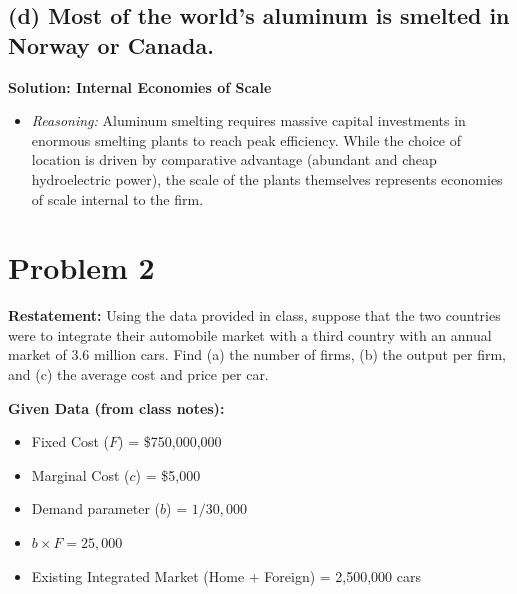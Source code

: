 \documentclass[11pt, letterpaper]{article}
\begin{document}
\subsection*{(d) Most of the world's aluminum is smelted in Norway or Canada.}
\noindent \textbf{Solution: Internal Economies of Scale}
\begin{itemize}
  \item \textit{Reasoning:} Aluminum smelting requires massive capital investments in enormous smelting plants to reach peak efficiency. While the choice of location is driven by comparative advantage (abundant and cheap hydroelectric power), the scale of the plants themselves represents economies of scale internal to the firm.
\end{itemize}

\vspace{1em}
\section*{Problem 2}

\textbf{Restatement:} Using the data provided in class, suppose that the two countries were to integrate their automobile market with a third country with an annual market of 3.6 million cars. Find (a) the number of firms, (b) the output per firm, and (c) the average cost and price per car.

\vspace{0.5em}
\noindent \textbf{Given Data (from class notes):}
\begin{itemize}
  \item Fixed Cost ($F$) = \$750,000,000
  \item Marginal Cost ($c$) = \$5,000
  \item Demand parameter ($b$) = $1 / 30,000$
  \item $b \times F = 25,000$
  \item Existing Integrated Market (Home + Foreign) = 2,500,000 cars
\end{itemize}


\end{document}
